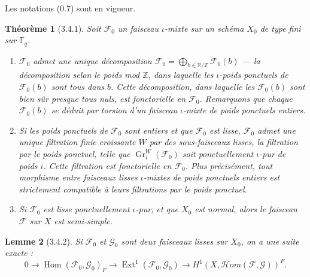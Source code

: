 \documentclass[12pt,a4paper]{article}
\theoremstyle{plain}
\newtheorem{theorem}{Th\'eor\`eme}[section]
\newtheorem{lemma}[theorem]{Lemme}
\theoremstyle{definition}
\theoremstyle{remark}
\DeclareMathOperator{\Ext}{Ext}
\DeclareMathOperator{\Gr}{Gr}
\DeclareMathOperator{\Hom}{Hom}
\newcommand{\FF}{{\mathbb{F}}}
\newcommand{\RR}{{\mathbb{R}}}
\newcommand{\ZZ}{{\mathbb{Z}}}
\begin{document}
Les notations (0.7) sont en vigueur.

\begin{theorem}[3.4.1]
Soit $\mathscr{F}_0$ un faisceau $\iota$-mixte sur un sch\'ema $X_0$ de type fini sur $\FF_q$.
\begin{enumerate}[label=(\roman*)]
\item $\mathscr{F}_0$ admet une unique d\'ecomposition $\mathscr{F}_0 = \bigoplus_{b \in \RR/\ZZ} \mathscr{F}_0(b)$ --- la d\'ecomposition selon le poids mod $\ZZ$, dans laquelle les $\iota$-poids ponctuels de $\mathscr{F}_0(b)$ sont tous dans $b$. Cette d\'ecomposition, dans laquelle les $\mathscr{F}_0(b)$ sont bien s\^ur presque tous nuls, est fonctorielle en $\mathscr{F}_0$. Remarquons que chaque $\mathscr{F}_0(b)$ se d\'eduit par torsion d'un faisceau $\iota$-mixte de poids ponctuels entiers.
\item Si les poids ponctuels de $\mathscr{F}_0$ sont entiers et que $\mathscr{F}_0$ est lisse, $\mathscr{F}_0$ admet une unique filtration finie croissante $W$ par des sous-faisceaux lisses, la filtration par le poids ponctuel, telle que $\Gr_i^W(\mathscr{F}_0)$ soit ponctuellement $\iota$-pur de poids $i$. Cette filtration est fonctorielle en $\mathscr{F}_0$. Plus pr\'ecis\'ement, tout morphisme entre faisceaux lisses $\iota$-mixtes de poids ponctuels entiers est strictement compatible \`a leurs filtrations par le poids ponctuel.
\item Si $\mathscr{F}_0$ est lisse ponctuellement $\iota$-pur, et que $X_0$ est normal, alors le faisceau $\mathscr{F}$ sur $X$ est semi-simple.
\end{enumerate}
\end{theorem}

\begin{lemma}[3.4.2]
Si $\mathscr{F}_0$ et $\mathscr{G}_0$ sont deux faisceaux lisses sur $X_0$, on a une suite exacte :
\[ 0 \to \Hom(\mathscr{F}_0, \mathscr{G}_0)_F \to \Ext^1(\mathscr{F}_0, \mathscr{G}_0) \to H^1(X, \mathscr{H}om(\mathscr{F}, \mathscr{G}))^F. \]
\end{lemma}
\end{document}
